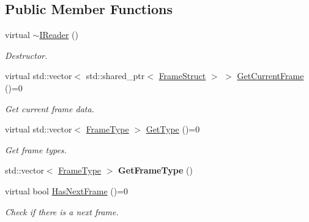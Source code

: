 \subsection*{Public Member Functions}
\begin{DoxyCompactItemize}
\item 
\mbox{\label{classmoetsi_1_1ssp_1_1IReader_ae1332862a7d81d99563f111ae36e142f}} 
virtual \hyperlink{classmoetsi_1_1ssp_1_1IReader_ae1332862a7d81d99563f111ae36e142f}{$\sim$\+I\+Reader} ()
\begin{DoxyCompactList}\small\item\em Destructor. \end{DoxyCompactList}\item 
\mbox{\label{classmoetsi_1_1ssp_1_1IReader_a357439182128e3911d77335c136035c0}} 
virtual std\+::vector$<$ std\+::shared\+\_\+ptr$<$ \hyperlink{structmoetsi_1_1ssp_1_1FrameStruct}{Frame\+Struct} $>$ $>$ \hyperlink{classmoetsi_1_1ssp_1_1IReader_a357439182128e3911d77335c136035c0}{Get\+Current\+Frame} ()=0
\begin{DoxyCompactList}\small\item\em Get current frame data. \end{DoxyCompactList}\item 
virtual std\+::vector$<$ \hyperlink{namespacemoetsi_1_1ssp_a46efdfa2cd5a28ead465dcc8006b5a87}{Frame\+Type} $>$ \hyperlink{classmoetsi_1_1ssp_1_1IReader_a4116c1931fde7bd66133934ffdca1cce}{Get\+Type} ()=0
\begin{DoxyCompactList}\small\item\em Get frame types. \end{DoxyCompactList}\item 
\mbox{\label{classmoetsi_1_1ssp_1_1IReader_a304ee5995522eff86ae0102d4d7342f8}} 
std\+::vector$<$ \hyperlink{namespacemoetsi_1_1ssp_a46efdfa2cd5a28ead465dcc8006b5a87}{Frame\+Type} $>$ {\bfseries Get\+Frame\+Type} ()
\item 
virtual bool \hyperlink{classmoetsi_1_1ssp_1_1IReader_af9186ba41e136dc4ec3242b5dd55fa04}{Has\+Next\+Frame} ()=0
\begin{DoxyCompactList}\small\item\em Check if there is a next frame. \end{DoxyCompactList}\item 
\mbox{\label{classmoetsi_1_1ssp_1_1IReader_a49e82a786cca55248e27e7fac8f97a17}} 

\end{DoxyCompactItemize}
